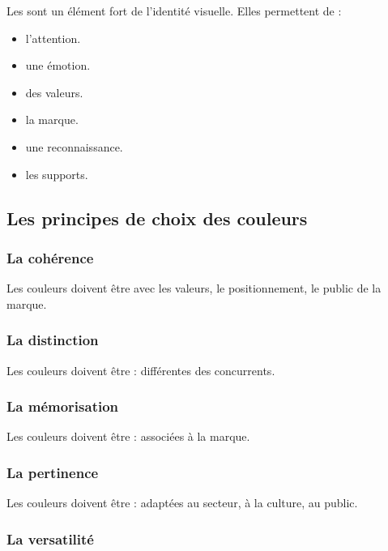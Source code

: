 Les  sont un élément fort de l'identité visuelle. Elles permettent de :

\begin{itemize}
    \item {} l'attention.
    \item {} une émotion.
    \item {} des valeurs.
    \item {} la marque.
    \item {} une reconnaissance.
    \item {} les supports.
\end{itemize}

\subsection{Les principes de choix des couleurs}

\subsubsection{La cohérence}

Les couleurs doivent être  avec les valeurs, le positionnement, le public de la marque.

\subsubsection{La distinction}

Les couleurs doivent être  : différentes des concurrents.

\subsubsection{La mémorisation}

Les couleurs doivent être  : associées à la marque.

\subsubsection{La pertinence}

Les couleurs doivent être  : adaptées au secteur, à la culture, au public.

\subsubsection{La versatilité}

